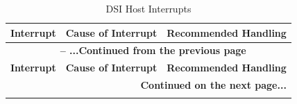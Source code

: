 \documentclass[main\_\_EN.tex]{subfiles}
\begin{document}
\begin{longtable}[c]{ |p{5cm}|p{5cm}|p{5cm}| }
    \caption{DSI Host Interrupts}
    \label{tab:dsi-host-interrupt}\\\hline

    \rowcolor{lightgray}
    \textbf{Interrupt} & \textbf{Cause of Interrupt} & \textbf{Recommended Handling}  \\\hline
    \endfirsthead


    \multicolumn{3}{c}{\bfseries \tablename\ \thetable{} -- ...Continued from the previous page}\\\hline
    \rowcolor{lightgray}
    \textbf{Interrupt} & \textbf{Cause of Interrupt} & \textbf{Recommended Handling}  \\\hline
    \endhead

    \multicolumn{3}{r}{\textbf{Continued on the next page...}} \\
    \endfoot

    \endlastfoot


\end{longtable}
\end{document}
